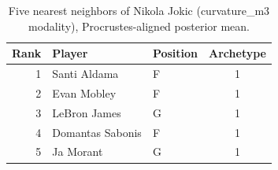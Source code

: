 \begin{table}[htbp]
  \centering\small
  \begin{tabular}{rllc}
    \toprule
    Rank & Player & Position & Archetype \\
    \midrule
    1 & Santi Aldama & F & 1 \\
    2 & Evan Mobley & F & 1 \\
    3 & LeBron James & G & 1 \\
    4 & Domantas Sabonis & F & 1 \\
    5 & Ja Morant & G & 1 \\
    \bottomrule
  \end{tabular}
  \caption{Five nearest neighbors of Nikola Jokic (curvature_m3 modality), Procrustes-aligned posterior mean.}
  \label{tab:Nikola_Jokic_neighbors_curvature_m3}
\end{table}

